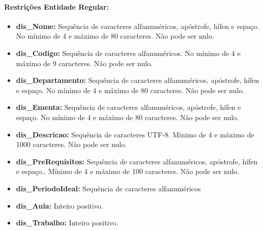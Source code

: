\documentclass{report}
\begin{document}
\paragraph{Restrições Entidade Regular:}
\begin{itemize}
  \item \textbf{dis\_Nome:} Sequência de caracteres alfanuméricos, apóstrofe, hífen e espaço. No mínimo de 4 e máximo de 80 caracteres. Não pode ser nulo.
  \item \textbf{dis\_Codigo:}  Sequência de caracteres alfanuméricos. No mínimo de 4 e máximo de 9 caracteres. Não pode ser nulo.
  \item \textbf{dis\_Departamento:} Sequência de caracteres alfanuméricos, apóstrofe, hífen e espaço. No mínimo de 4 e máximo de 80 caracteres. Não pode ser nulo.
  \item \textbf{dis\_Ementa:} Sequência de caracteres alfanuméricos, apóstrofe, hífen e espaço. No mínimo de 4 e máximo de 80 caracteres. Não pode ser nulo.
  \item \textbf{dis\_Descricao:} Sequência de caracteres UTF-8. Mínimo de 4 e máximo de 1000 caracteres. Não pode ser nulo.
  \item \textbf{dis\_PreRequisitos:} Sequência de caracteres alfanuméricos, apóstrofe, hífen e espaço.. Mínimo de 4 e máximo de 100 caracteres. Não pode ser nulo.
  \item \textbf{dis\_PeriodoIdeal:} Sequência de caracteres alfanuméricos 	  
  \item \textbf{dis\_Aula:} Inteiro positivo.
  \item \textbf{dis\_Trabalho:} Inteiro positivo.
\end{itemize}
\end{document}
